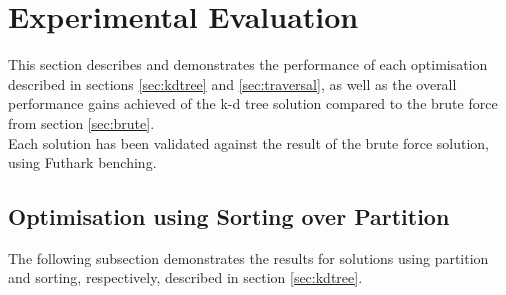 \section{Experimental Evaluation}
\label{sec:eval}




This section describes and demonstrates the performance of each optimisation described in sections \ref{sec:kdtree} and \ref{sec:traversal}, as well as the overall performance gains achieved of the k-d tree solution compared to the brute force from section \ref{sec:brute}.
\\[2mm]
Each solution has been validated against the result of the brute force solution, using Futhark benching.  


\subsection{Optimisation using Sorting over Partition}

The following subsection demonstrates the results for solutions using partition and sorting, respectively, described in section \ref{sec:kdtree}. 

